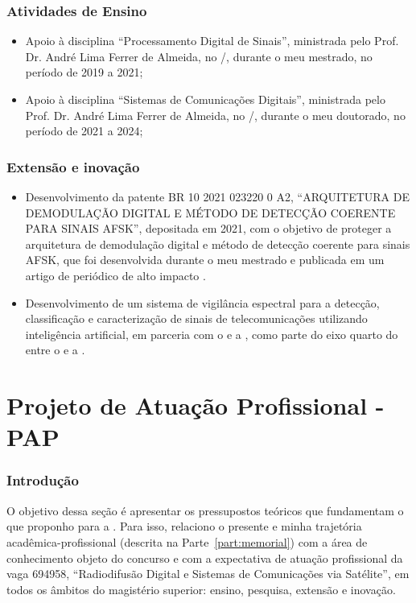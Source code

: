 \documentclass{article}
\begin{document}
\section{Atividades de Ensino}

\begin{itemize}
    \item Apoio à disciplina ``Processamento Digital de Sinais'', ministrada pelo Prof. Dr. André Lima Ferrer de Almeida, no /, durante o meu mestrado, no período de 2019 a 2021;
    \item Apoio à disciplina ``Sistemas de Comunicações Digitais'', ministrada pelo Prof. Dr. André Lima Ferrer de Almeida, no /, durante o meu doutorado, no período de 2021 a 2024;
\end{itemize}

\section{Extensão e inovação}

\begin{itemize}
    \item Desenvolvimento da patente BR 10 2021 023220 0 A2, ``ARQUITETURA DE DEMODULAÇÃO DIGITAL E MÉTODO DE DETECÇÃO COERENTE PARA SINAIS AFSK'', depositada em 2021, com o objetivo de proteger a arquitetura de demodulação digital e método de detecção coerente para sinais AFSK, que foi desenvolvida durante o meu mestrado e publicada em um artigo de periódico de alto impacto \cite{pacelliAlldigitalCoherentAFSK2025}.
    \item Desenvolvimento de um sistema de vigilância espectral para a detecção, classificação e caracterização de sinais de telecomunicações utilizando inteligência artificial, em parceria com o  e a , como parte do eixo quarto do  entre o  e a .
\end{itemize}


\part{Projeto de Atuação Profissional - PAP}

\section{Introdução}

O objetivo dessa seção é apresentar os pressupostos teóricos que fundamentam o  que proponho para a . Para isso, relaciono o presente  e minha trajetória acadêmica-profissional (descrita na Parte~\ref{part:memorial}) com a área de conhecimento objeto do concurso e com a expectativa de atuação profissional da vaga 694958, ``Radiodifusão Digital e Sistemas de Comunicações via Satélite'', em todos os âmbitos do magistério superior: ensino, pesquisa, extensão e inovação.
\end{document}
